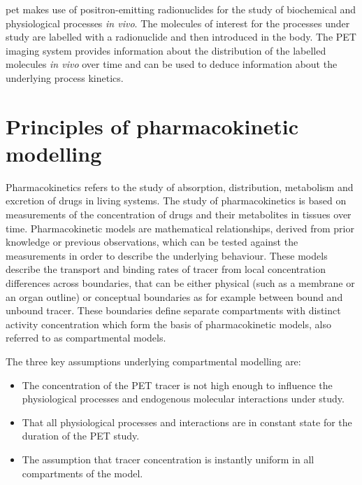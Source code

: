 \Gls{pet} makes use of positron-emitting radionuclides for the study of biochemical and physiological processes \textit{in vivo}. The molecules of interest for the processes under study are labelled with a radionuclide and then introduced in the body. The PET imaging system provides information about the distribution of the labelled molecules \textit{in vivo} over time and can be used to deduce information about the underlying process kinetics. 

\section{Principles of pharmacokinetic modelling}
Pharmacokinetics refers to the study of absorption, distribution, metabolism and excretion of drugs in living systems. The study of pharmacokinetics is based on measurements of the concentration of drugs and their metabolites in tissues over time. Pharmacokinetic models are mathematical relationships, derived from prior knowledge or previous observations, which can be tested against the measurements in order to describe the underlying behaviour. These models describe the transport and binding rates of tracer from local concentration differences across boundaries, that can be either physical (such as a membrane or an organ outline) or conceptual boundaries as for example between bound and unbound tracer. These boundaries define separate compartments with distinct activity concentration which form the basis of pharmacokinetic models, also referred to as compartmental models.

The three key assumptions underlying compartmental modelling are:
\begin{itemize}
\item The concentration of the PET tracer is not high enough to influence the physiological processes and endogenous molecular interactions under study.
\item That all physiological processes and interactions are in constant state for the duration of the PET study.
\item The assumption that tracer concentration is instantly uniform in all compartments of the model.
\end{itemize}


